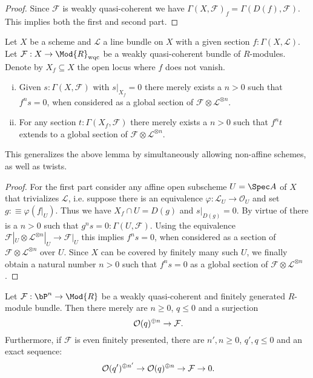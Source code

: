 \begin{proof}
  Since $\mathcal F$ is weakly quasi-coherent we have $\Gamma (X,\mathcal F)_f = \Gamma (D(f),\mathcal F)$.
  This implies both the first and second part.
\end{proof}


\begin{lemma}
  \label{extension-of-sections-by-twisting}
  Let $X$ be a scheme and $\mathcal L$ a line bundle on $X$ with a given section $f:\Gamma (X,\mathcal L)$.
  Let $\mathcal F:X\to \Mod{R}_{\mathrm{wqc}}$ be a weakly quasi-coherent bundle of $R$-modules.
  Denote by $X_f \subseteq X$ the open locus where $f$ does not vanish.
  \begin{enumerate}[(i)]
    \item Given $s:\Gamma (X,\mathcal F)$ with $s|_{X_f} = 0$ there merely exists a $n>0$ such that $f^ns=0$,
      when considered as a global section of $\mathcal F \otimes \mathcal L^{\otimes n}$.
    \item For any section $t:\Gamma (X_f,\mathcal F)$ there merely exists a $n>0$
      such that $f^nt$ extends to a global section of $\mathcal F \otimes \mathcal L^{\otimes n}$.
  \end{enumerate}
\end{lemma}

This generalizes the above lemma by simultaneously allowing non-affine schemes, as well as twists.

\begin{proof}
  For the first part consider any affine open subscheme $U=\Spec A$ of $X$ that trivializes $\mathcal L$,
  i.e. suppose there is an equivalence  $\varphi:\mathcal L_U \to \mathcal O_U$ and set $g :\equiv \varphi(f|_U)$.
  Thus we have $X_f\cap U = D(g)$ and $s|_{D(g)}=0$.
  By virtue of  there is a $n>0$ such that $g^ns=0:\Gamma (U,\mathcal F)$.
  Using the equivalence $\mathcal F|_U\otimes\mathcal L^{\otimes n}|_U \to \mathcal F|_U$ this implies $f^ns=0$,
  when considered as a section of $\mathcal F\otimes\mathcal L^{\otimes n}$ over $U$.
  Since $X$ can be covered by finitely many such $U$, we finally obtain a natural number $n>0$ such that $f^ns=0$ as a global section of $\mathcal F\otimes\mathcal L^{\otimes n}$.

\end{proof}

\begin{proposition}
  \label{fp-module-bundle-globally-generated}
  Let $\mathcal F:\bP^n \to \Mod{R}$ be a weakly quasi-coherent and finitely generated $R$-module bundle.
  Then there merely are $n\geq 0$, $q\leq 0$ and a surjection
  \[ \mathcal O(q)^{\oplus n}\to \mathcal F\rlap{.}\]
  Furthermore, if $\mathcal F$ is even finitely presented, there are $n',n\geq 0$, $q',q\leq 0$ and an exact sequence:
  \[ \mathcal O(q')^{\oplus n'}\to \mathcal O(q)^{\oplus n}\to \mathcal F\to 0\rlap{.}\]
\end{proposition}

